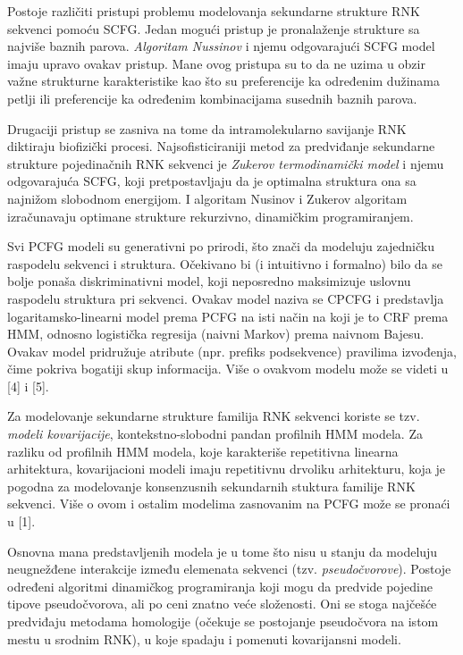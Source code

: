 \documentclass[a4paper, 12pt]{article}
\begin{document}
Postoje različiti pristupi problemu modelovanja sekundarne strukture RNK sekvenci pomoću SCFG. Jedan mogući pristup je pronalaženje strukture sa najviše baznih parova. \textit{Algoritam Nussinov} i njemu odgovarajući SCFG model imaju upravo ovakav pristup. Mane ovog pristupa su to da ne uzima u obzir važne strukturne karakteristike kao što su preferencije ka određenim dužinama petlji ili preferencije ka određenim kombinacijama susednih baznih parova.

Drugaciji pristup se zasniva na tome da intramolekularno savijanje RNK diktiraju biofizički procesi. Najsofisticiraniji metod za predviđanje sekundarne strukture pojedinačnih RNK sekvenci je \textit{Zukerov termodinamički model} i njemu odgovarajuća SCFG, koji pretpostavljaju da je optimalna struktura ona sa najnižom slobodnom energijom. I algoritam Nusinov i Zukerov algoritam izračunavaju optimane strukture rekurzivno, dinamičkim programiranjem.

Svi PCFG modeli su generativni po prirodi, što znači da modeluju zajedničku raspodelu sekvenci i struktura. Očekivano bi (i intuitivno i formalno) bilo da se bolje ponaša diskriminativni model, koji neposredno maksimizuje uslovnu raspodelu struktura pri sekvenci. Ovakav model naziva se CPCFG i predstavlja logaritamsko-linearni model prema PCFG na isti način na koji je to CRF prema HMM, odnosno logistička regresija (naivni Markov) prema naivnom Bajesu. Ovakav model pridružuje atribute (npr. prefiks podsekvence) pravilima izvođenja, čime pokriva bogatiji skup informacija. Više o ovakvom modelu može se videti u [4] i [5].

Za modelovanje sekundarne strukture familija RNK sekvenci koriste se tzv. \textit{modeli kovarijacije}, kontekstno-slobodni pandan profilnih HMM modela. Za razliku od profilnih HMM modela, koje karakteriše repetitivna linearna arhitektura, kovarijacioni modeli imaju repetitivnu drvoliku arhitekturu, koja je pogodna za modelovanje konsenzusnih sekundarnih stuktura familije RNK sekvenci. Više o ovom i ostalim modelima zasnovanim na PCFG može se pronaći u [1].

Osnovna mana predstavljenih modela je u tome što nisu u stanju da modeluju neugnežđene interakcije između elemenata sekvenci (tzv. \textit{pseudočvorove}). Postoje određeni algoritmi dinamičkog programiranja koji mogu da predvide pojedine tipove pseudočvorova, ali po ceni znatno veće složenosti. Oni se stoga najčešće predviđaju metodama homologije (očekuje se postojanje pseudočvora na istom mestu u srodnim RNK), u koje spadaju i pomenuti kovarijansni modeli.
\end{document}
